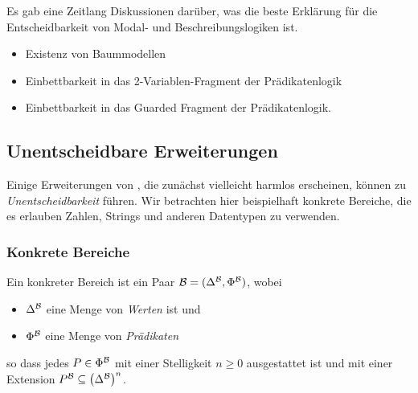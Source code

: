 Es gab eine Zeitlang Diskussionen darüber, was die beste Erklärung für die Entscheidbarkeit von Modal- und Beschreibungslogiken ist.
\begin{itemize}
    \item Existenz von Baummodellen
    \item Einbettbarkeit in das 2-Variablen-Fragment der Prädikatenlogik
    \item Einbettbarkeit in das Guarded Fragment der Prädikatenlogik.
\end{itemize}

\subsection{Unentscheidbare Erweiterungen}\label{unentscheidbare-erweiterungen}

Einige Erweiterungen von \ALC, die zunächst vielleicht harmlos erscheinen, können zu \emph{Unentscheidbarkeit} führen. Wir betrachten hier beispielhaft konkrete Bereiche, die es erlauben Zahlen, Strings und anderen Datentypen zu verwenden.

\subsubsection{Konkrete Bereiche}

\begin{definition}
    Ein konkreter Bereich ist ein Paar $\mathcal{B} = (\Delta^{\mathcal{B}}, \Phi^{\mathcal{B}})$, wobei
\begin{itemize}
    \item $\Delta^{\mathcal{B}}$ eine Menge von \emph{Werten} ist und
    \item $\Phi^{\mathcal{B}}$ eine Menge von \emph{Prädikaten}
\end{itemize}
so dass jedes $P \in \Phi^{\mathcal{B}}$ mit einer Stelligkeit $n \geq 0$
ausgestattet ist und mit einer Extension
$P^\MB \subseteq {\left( \Delta^\MB \right)}^n$.
\end{definition}

